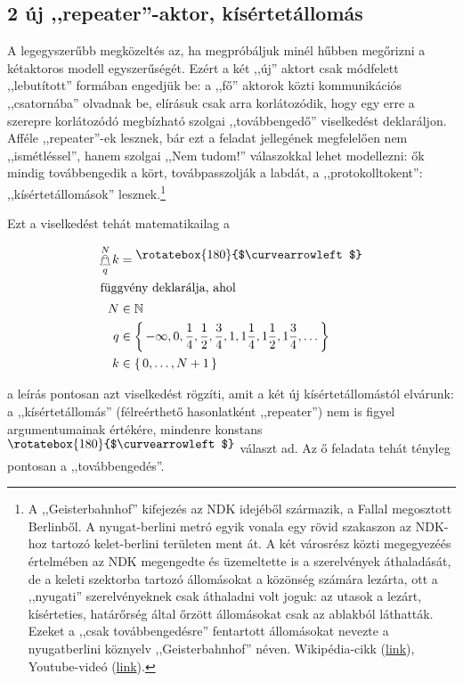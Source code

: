 \documentclass{article}
\newcommand{\nothing}{\text{\raisebox{0.4em}{\rotatebox{180}{$\curvearrowleft$}}}}%
\newcommand{\just}[1]{\boxed{#1}}%
\newcommand{\incl}{\mathbf{incl}}
\newcommand{\excl}{\mathbf{excl}}
\newcommand{\setOf}[1]{\left\lbrace\,#1\,\right\rbrace}
\newcommand{\mainfun}[3]{\mathwitch_{#1}^{#2}#3}
\newcommand{\nomainfun}[3]{\bigskull_{#1}^{#2}#3}
\newcommand{\mainfunA}[3]{\mathwitch_{#2}^{#1}#3}
\newcommand{\nomainfunA}[3]{{}_{\mathwitch}\!\!\!\!\bigskull^{#1}_{#2}#3}
\newcommand{\gbh}[3]{\mathop{\mathghost}^{#1}_{#2}#3}
\begin{document}
	\subsection{2 új ,,repeater''-aktor, kísértetállomás}


	A legegyszerűbb megközeltés az, ha megpróbáljuk minél hűbben megőrizni a kétaktoros modell egyszerűségét. Ezért a két ,,új'' aktort csak módfelett ,,lebutított'' formában engedjük be: a ,,fő'' aktorok közti kommunikációs ,,csatornába'' olvadnak be, elírásuk csak arra korlátozódik, hogy egy erre a szerepre korlátozódó megbízható szolgai ,,továbbengedő'' viselkedést deklaráljon.
	Afféle ,,repeater''-ek lesznek, bár ezt a feladat jellegének megfelelően nem ,,ismétléssel'', hanem szolgai ,,Nem tudom!'' válaszokkal lehet modellezni: ők mindig továbbengedik a kört, továbpasszolják a labdát, a ,,protokolltokent'': ,,kísértetállomások'' lesznek.\footnote{A ,,Geisterbahnhof'' kifejezés az NDK idejéből származik, a Fallal megosztott Berlinből. A nyugat-berlini metró egyik vonala  egy rövid szakaszon az NDK-hoz tartozó kelet-berlini területen ment át. A két városrész közti megegyezéés értelmében az NDK megengedte és  üzemeltette is a szerelvények áthaladását, de a keleti szektorba tartozó állomásokat a közönség számára lezárta, ott a ,,nyugati'' szerelvényeknek csak áthaladni volt joguk: az utasok a lezárt, kísérteties, határőrség által őrzött állomásokat csak az ablakból láthatták. Ezeket a ,,csak továbbengedésre'' fentartott állomásokat nevezte a nyugatberlini köznyelv ,,Geisterbahnhof'' néven. Wikipédia-cikk (\href{https://en.wikipedia.org/wiki/Ghost_station}{link}), Youtube-videó (\href{https://www.youtube.com/watch?v=jSwbcCx8rfQ}{link}).}

	Ezt a viselkedést tehát matematikailag a
	
	\begin{align*}
		\gbh Nqk &= \nothing\\\intertext{függvény deklarálja, ahol}
		N &\in \mathbb N\\
		q &\in \setOf{-\infty, 0, \frac14, \frac12, \frac34, 1, 1\frac14, 1\frac12, 1\frac34, \dots}\\
		k &\in \setOf{0, \dots, N + 1}
	\end{align*}

	a leírás pontosan azt viselkedést rögzíti, amit a két új kísértetállomástól elvárunk: a ,,kísértetállomás'' (félreérthető hasonlatként ,,repeater'') nem is figyel argumentumainak értékére, mindenre konstans $\nothing$ választ ad. Az ő feladata tehát tényleg pontosan a ,,továbbengedés''.
\end{document}
